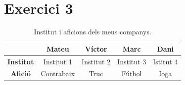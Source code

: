 \section{Exercici 3}
\begin{table}[h!]
\centering
\begin{tabular}{c|c|c|c|c|}
& \bf{Mateu} & \bf{Víctor} & \bf{Marc} & \bf{Dani} \\
\hline
\bf{Institut} & Institut 1 & Institut 2 & Institut 3 & Istitut 4 \\
\hline
\bf{Afició} & Contrabaix & Truc & Fútbol & Ioga \\
\hline
\end{tabular}
\caption{Institut i aficions dels meus companys.}\label{tab:InfoComp}
\end{table}
